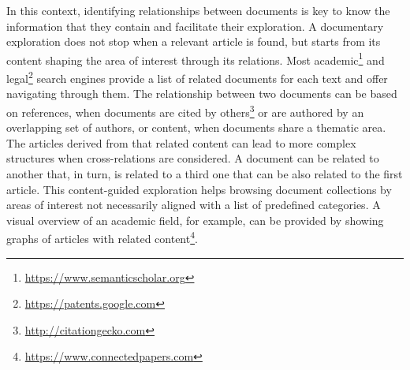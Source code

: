 In this context, identifying relationships between documents is key to know the information that they contain and facilitate their exploration. A documentary exploration does not stop when a relevant article is found, but starts from its content shaping the area of interest through its relations. Most academic\footnote{\url{https://www.semanticscholar.org}} and legal\footnote{\url{https://patents.google.com}} search engines provide a list of related documents for each text and offer navigating through them. The relationship between two documents can be based on references, when documents are cited by others\footnote{\url{http://citationgecko.com}} or are authored by an overlapping set of authors, or content, when documents share a thematic area. The articles derived from that related content can lead to more complex structures when cross-relations are considered. A document can be related to another that, in turn, is related to a third one that can be also related to the first article. This content-guided exploration helps browsing document collections by areas of interest not necessarily aligned with a list of predefined categories. A visual overview of an academic field, for example, can be provided by showing graphs of articles with related content\footnote{\url{https://www.connectedpapers.com}}.

